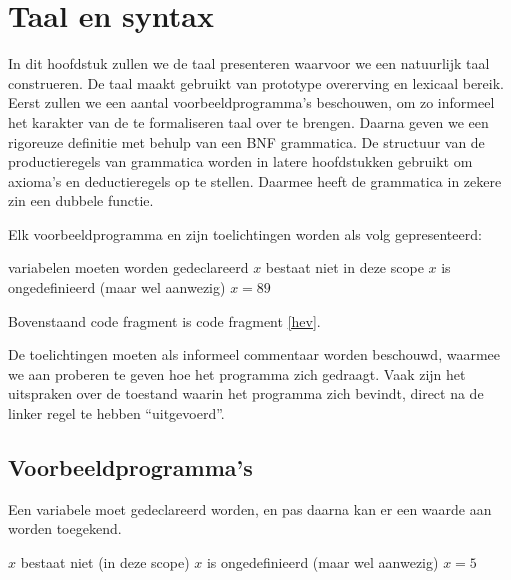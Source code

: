 
\chapter{Taal en syntax}

In dit hoofdstuk zullen we de taal presenteren waarvoor we een natuurlijk taal construeren. De taal maakt gebruikt van prototype overerving en lexicaal bereik. Eerst zullen we een aantal voorbeeldprogramma's beschouwen, om zo informeel het karakter van de te formaliseren taal over te brengen. Daarna geven we een rigoreuze definitie met behulp van een BNF grammatica. De structuur van de productieregels van grammatica worden in latere hoofdstukken gebruikt om axioma's en deductieregels op te stellen. Daarmee heeft de grammatica in zekere zin een dubbele functie.

Elk voorbeeldprogramma en zijn toelichtingen worden als volg gepresenteerd:

	\begin{CodeFragment}\label{hev}
		                      {variabelen moeten worden gedeclareerd}
		      {}
		                  {}
		    {}
		\Line{}             {$x$ bestaat niet in deze scope}
		                      {$x$ is ongedefinieerd (maar wel aanwezig)}
		                   {$x = 89$}
	\end{CodeFragment}

Bovenstaand code fragment is code fragment \ref{hev}.

De toelichtingen moeten als informeel commentaar worden beschouwd, waarmee we aan proberen te geven hoe het programma zich gedraagt. Vaak zijn het uitspraken over de toestand waarin het programma zich bevindt, direct na de linker regel te hebben ``uitgevoerd''.

\section{Voorbeeldprogramma's}

Een variabele moet gedeclareerd worden, en pas daarna kan er een waarde aan worden toegekend.

	\begin{CodeFragment}
		\Line{}                            {$x$ bestaat niet (in deze scope)}
		                      {$x$ is ongedefinieerd (maar wel aanwezig)}
		                       {$x = 5$}
	\end{CodeFragment}

